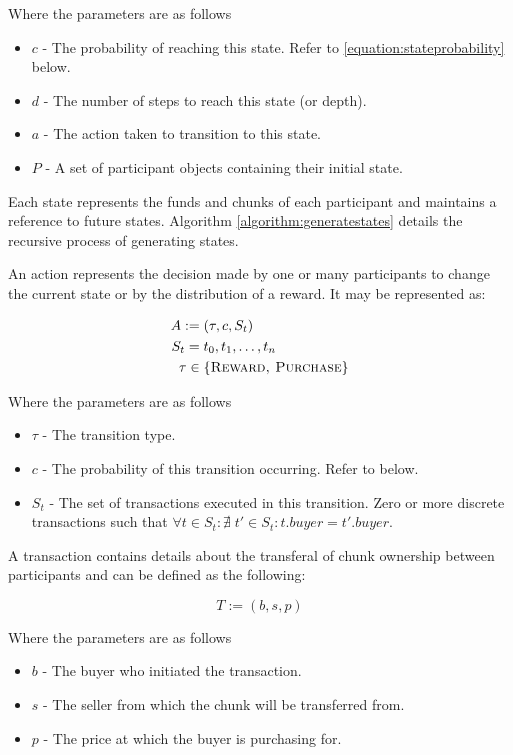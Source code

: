 \noindent Where the parameters are as follows
\begin{itemize}
    \item $c$ - The probability of reaching this state. Refer to \cref{equation:stateprobability} below.
    \item $d$ - The number of steps to reach this state (or depth).
    \item $a$ - The action taken to transition to this state.
    \item $P$ - A set of participant objects containing their initial state.
\end{itemize}

Each state represents the funds and chunks of each participant and maintains a reference to future states. Algorithm \ref{algorithm:generatestates} details the recursive process of generating states.

An action represents the decision made by one or many participants to change the current state or by the distribution of a reward. It may be represented as:

\begin{align}
    A :=&\; (\tau, c, S_t) \\
    S_t =&\; {t_0, t_1, \ldots, t_n} \\
    \tau \in&\; \{\textsc{Reward, Purchase}\}
\end{align}

\noindent Where the parameters are as follows
\begin{itemize}
    \item $\tau$ - The transition type.
    \item $c$ - The probability of this transition occurring. Refer to  below.
    \item $S_t$ - The set of transactions executed in this transition. Zero or more discrete transactions such that $\forall t \in S_t : \nexists \; t' \in S_t : t.buyer = t'.buyer$.
\end{itemize}

A transaction contains details about the transferal of chunk ownership between participants and can be defined as the following:

\begin{equation}
    T := (b, s, p)
\end{equation}

\noindent Where the parameters are as follows
\begin{itemize}
    \item $b$ - The buyer who initiated the transaction.
    \item $s$ - The seller from which the chunk will be transferred from.
    \item $p$ - The price at which the buyer is purchasing for.
\end{itemize}

